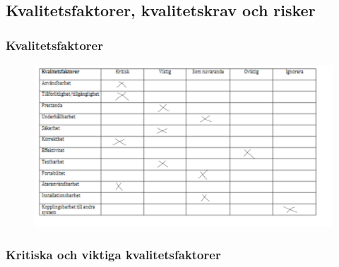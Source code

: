 \documentclass{article}
\begin{document}
\subsection{Kvalitetsfaktorer, kvalitetskrav och risker}

\subsubsection{Kvalitetsfaktorer}
\begin{figure}[htp]
    \centering
    \includegraphics[width = 500px]{41.png}
    \label{fig:24}
\end{figure}




\subsubsection{Kritiska och viktiga kvalitetsfaktorer}
\end{document}
